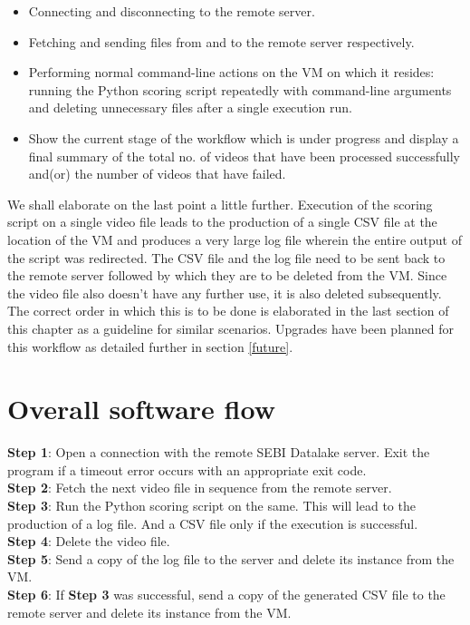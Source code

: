 \begin{itemize}
 \item Connecting and disconnecting to the remote server.
 \item Fetching and sending files from and to the remote server respectively.
 \item Performing normal command-line actions on the VM on which it resides: running the Python scoring script repeatedly with command-line arguments and deleting unnecessary files after a single execution run.
 \item Show the current stage of the workflow which is under progress and display a final summary of the total no. of videos that have been processed successfully and(or) the number of videos that have failed.

\end{itemize}

We shall elaborate on the last point a little further. Execution of the scoring script on a single video file leads to the production of a single CSV file at the location of the VM and produces a very large log file wherein the entire output of the script was redirected. The CSV file and the log file need to be sent back to the remote server followed by which they are to be deleted from the VM. Since the video file also doesn’t have any further use, it is also deleted subsequently. The correct order in which this is to be done is elaborated in the last section of this chapter as a guideline for similar scenarios. Upgrades have been planned for this workflow as detailed further in section \ref{future}.


\section{Overall software flow}

\textbf{Step 1}: Open a connection with the remote SEBI Datalake server. Exit the program if a timeout error occurs with an appropriate exit code. \\[5mm]
\textbf{Step 2}: Fetch the next video file in sequence from the remote server. \\[5mm]
\textbf{Step 3}: Run the Python scoring script on the same. This will lead to the production of a log file. And a CSV file only if the execution is successful. \\[5mm]
\textbf{Step 4}: Delete the video file. \\[5mm]
\textbf{Step 5}: Send a copy of the log file to the server and delete its instance from the VM. \\[5mm]
\textbf{Step 6}: If \textbf{Step 3} was successful, send a copy of the generated CSV file to the remote server and delete its instance from the VM.


